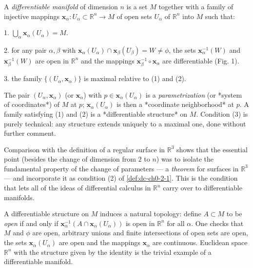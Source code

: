\begin{definition}
  \label{def:dc-ch0-2-1}
  \leanok
  A \emph{differentiable manifold} of dimension $n$ is a set $M$ together with a family
  of injective mappings $\mathbf{x}_\alpha:U_\alpha\subset\mathbb{R}^n\to M$ of open
  sets $U_\alpha$ of $\mathbb{R}^n$ into $M$ such that:
  
  1. $\bigcup_\alpha\mathbf{x}_\alpha(U_\alpha)=M$.
  
  2. for any pair $\alpha,\beta$ with
     $\mathbf{x}_\alpha(U_\alpha)\cap\mathbf{x}_\beta(U_\beta)=W\neq\phi$, the sets
     $\mathbf{x}_\alpha^{-1}(W)$ and $\mathbf{x}_\beta^{-1}(W)$ are open in
     $\mathbb{R}^n$ and the mappings $\mathbf{x}_\beta^{-1}\circ\mathbf{x}_\alpha$
     are differentiable (Fig. 1).
  
  3. the family $\{(U_\alpha,\mathbf{x}_\alpha)\}$ is maximal relative to (1) and (2).
  
  The pair $(U_\alpha,\mathbf{x}_\alpha)$ (or $\mathbf{x}_\alpha$) with
  $p\in\mathbf{x}_\alpha(U_\alpha)$ is a \emph{parametrization} (or *system of
  coordinates*) of $M$ at $p$; $\mathbf{x}_\alpha(U_\alpha)$ is then a *coordinate
  neighborhood* at $p$. A family satisfying (1) and (2) is a *differentiable
  structure* on $M$. Condition (3) is purely technical: any structure extends
  uniquely to a maximal one, done without further comment.
\end{definition}

\begin{remark}
  \label{rem:dc-ch0-2-2}
  \notready
  Comparison with the definition of a regular surface in $\mathbb{R}^3$ shows that
  the essential point (besides the change of dimension from $2$ to $n$) was to
  isolate the fundamental property of the change of parameters — a \emph{theorem} for
  surfaces in $\mathbb{R}^3$ — and incorporate it as condition (2) of \cref{def:dc-ch0-2-1}. This is the condition that lets all of the ideas of differential calculus
  in $\mathbb{R}^n$ carry over to differentiable manifolds.
\end{remark}

\begin{remark}
  \label{rem:dc-ch0-2-3}
  \notready
  A differentiable structure on $M$ induces a natural topology: define $A\subset M$
  to be \emph{open} if and only if $\mathbf{x}_\alpha^{-1}(A\cap\mathbf{x}_\alpha(U_\alpha))$
  is open in $\mathbb{R}^n$ for all $\alpha$. One checks that $M$ and $\phi$ are
  open, arbitrary unions and finite intersections of open sets are open, the sets
  $\mathbf{x}_\alpha(U_\alpha)$ are open and the mappings $\mathbf{x}_\alpha$ are
  continuous. Euclidean space $\mathbb{R}^n$ with the structure given by the
  identity is the trivial example of a differentiable manifold.
\end{remark}

